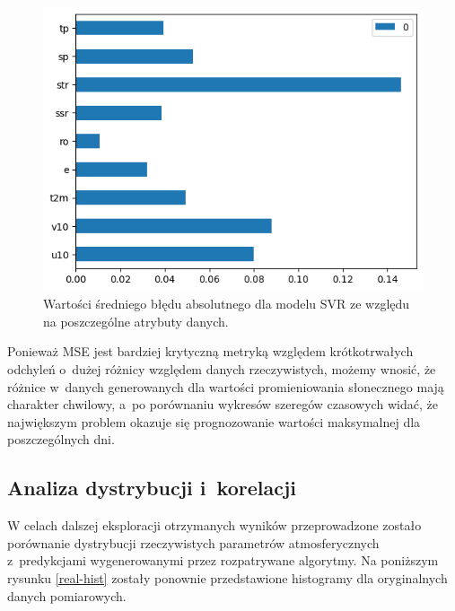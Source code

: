 \begin{figure}[H]
    \centering
    \includegraphics[width=\textwidth]{images/svr_mae_bar.png}
    \caption[Średni błąd absolutny dla SVR]{Wartości średniego błędu absolutnego dla modelu SVR ze względu na poszczególne atrybuty danych.}
    \label{svr-mae-bar}
\end{figure}

Ponieważ MSE jest bardziej krytyczną metryką względem krótkotrwałych odchyleń o~dużej różnicy względem
danych rzeczywistych, możemy wnosić, że różnice w~danych generowanych dla wartości promieniowania słonecznego
mają charakter chwilowy, a~po porównaniu wykresów szeregów czasowych widać, że największym problem okazuje
się prognozowanie wartości maksymalnej dla poszczególnych dni.

\pagebreak

\subsection{Analiza dystrybucji i~korelacji}

W celach dalszej eksploracji otrzymanych wyników przeprowadzone zostało porównanie dystrybucji 
rzeczywistych parametrów atmosferycznych z~predykcjami wygenerowanymi przez rozpatrywane algorytmy.
Na poniższym rysunku \ref{real-hist} zostały ponownie przedstawione histogramy dla oryginalnych danych pomiarowych.

